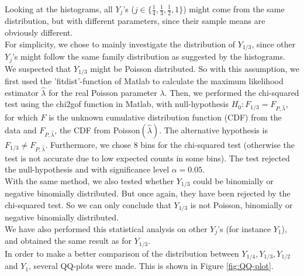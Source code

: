Looking at the histograms, all $Y_j$'s ($j\in \{\frac{1}{4},\frac{1}{3},\frac{1}{2},1\}$) might come from the same distribution, but with different parameters, since their sample means are obviously different.\\

For simplicity, we chose to mainly investigate the distribution of $Y_{1/3}$, since other $Y_j$'s might follow the same family distribution as suggested by the histograms. We suspected that $Y_{1/3}$ might be Poisson distributed. So with this assumption, we first used the 'fitdist'-function of Matlab to calculate the maximum likelihood estimator $\hat{\lambda}$ for the real Poisson parameter $\lambda$. Then, we performed the chi-squared test using the chi2gof function in Matlab, with null-hypothesis $H_0:F_{1/3}=F_{P,\hat{\lambda}}$, for which $F$ is the unknown cumulative distribution function (CDF) from the data and $F_{P,\hat{\lambda}}$, the CDF from Poisson$(\hat{\lambda})$. The alternative hypothesis is $F_{1/3}\neq F_{P,\hat{\lambda}}$. Furthermore, we chose 8 bins for the chi-squared test (otherwise the test is not accurate due to low expected counts in some bins). The test rejected the null-hypothesis and with significance level $\alpha=0.05$. \\   

With the same method, we also tested whether $Y_{1/3}$ could be binomially or negative binomially distributed. But once again, they have been rejected by the chi-squared test. So we can only conclude that $Y_{1/3}$ is not Poisson, binomially or negative binomially distributed.\\
We have also performed this statistical analysis on other $Y_j$'s (for instance $Y_1$), and  obtained the same result as for $Y_{1/3}$.\\

In order to make a better comparison of the distribution between $Y_{1/4},Y_{1/3},Y_{1/2}$ and $Y_1$, several QQ-plots were made. 
This is shown in Figure \ref{fig:QQ-plot}.\\ 

